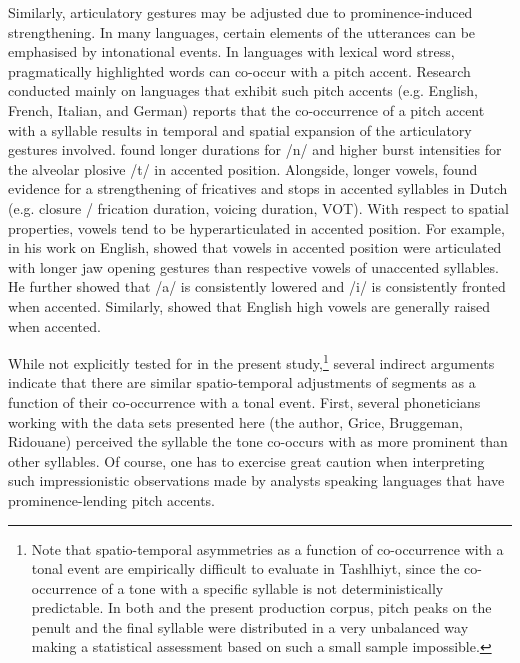 \largerpage
Similarly, articulatory gestures may be adjusted due to prominence-induced strengthening. In many languages, certain elements of the utterances can be emphasised by intonational events. In languages with lexical word stress, pragmatically highlighted words can co-occur with a pitch accent. Research conducted mainly on languages that exhibit such pitch accents (e.g. English, French, Italian, and German) reports that the co-occurrence of a pitch accent with a syllable results in temporal and spatial expansion of the articulatory gestures involved.\citet{ChoKeating2009} found longer durations for /n/ and higher burst intensities for the alveolar plosive /t/ in accented position. Alongside, longer vowels, \citet{ChoMcQueen2005} found evidence for a strengthening of fricatives and stops in accented syllables in Dutch (e.g. closure / frication duration, voicing duration, VOT). With respect to spatial properties, vowels tend to be hyperarticulated in accented position. For example, in his work on English, \citet{Cho2005} showed that vowels in accented position were articulated with longer jaw opening gestures than respective vowels of unaccented syllables. He further showed that /a/ is consistently lowered and /i/ is consistently fronted when accented. Similarly, \citet{Harrington.etal2000} showed that English high vowels are generally raised when accented. 
  
While not explicitly tested for in the present study,\footnote{Note that spatio-temporal asymmetries as a function of co-occurrence with a tonal event are empirically difficult to evaluate in Tashlhiyt, since the co-occurrence of a tone with a specific syllable is not deterministically predictable. In both \citet{Grice.etal2015tash} and the present production corpus, pitch peaks on the penult and the final syllable were distributed in a very unbalanced way making a statistical assessment based on such a small sample impossible.} several indirect arguments indicate that there are similar spatio-temporal adjustments of segments as a function of their co-occurrence with a tonal event. First, several phoneticians working with the data sets presented here (the author, Grice, Bruggeman, Ridouane) perceived the syllable the tone co-occurs with as more prominent than other syllables. Of course, one has to exercise great caution when interpreting such impressionistic observations made by analysts speaking languages that have prominence-lending pitch accents.

